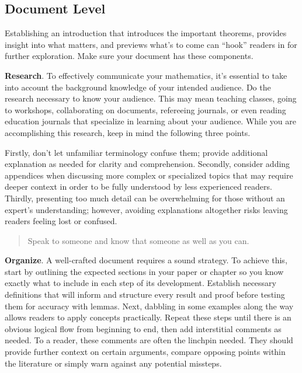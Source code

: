 \documentclass[
  twoside,
  12pt,
  letterpaper,
  fleqn]{article}
\begin{document}
\hypertarget{document-level}{%
\subsection{Document Level}\label{document-level}}

Establishing an introduction that introduces the important theorems,
provides insight into what matters, and previews what's to come can
``hook'' readers in for further exploration. Make sure your document has
these components.

\textbf{Research}. To effectively communicate your mathematics, it's
essential to take into account the background knowledge of your intended
audience. Do the research necessary to know your audience. This may mean
teaching classes, going to workshops, collaborating on documents,
refereeing journals, or even reading education journals that specialize
in learning about your audience. While you are accomplishing this
research, keep in mind the following three points.

Firstly, don't let unfamiliar terminology confuse them; provide
additional explanation as needed for clarity and comprehension.
Secondly, consider adding appendices when discussing more complex or
specialized topics that may require deeper context in order to be fully
understood by less experienced readers. Thirdly, presenting too much
detail can be overwhelming for those without an expert's understanding;
however, avoiding explanations altogether risks leaving readers feeling
lost or confused.

\begin{quote}
Speak to someone and know that someone as well as you can.
\end{quote}

\textbf{Organize}. A well-crafted document requires a sound strategy. To
achieve this, start by outlining the expected sections in your paper or
chapter so you know exactly what to include in each step of its
development. Establish necessary definitions that will inform and
structure every result and proof before testing them for accuracy with
lemmas. Next, dabbling in some examples along the way allows readers to
apply concepts practically. Repeat these steps until there is an obvious
logical flow from beginning to end, then add interstitial comments as
needed. To a reader, these comments are often the linchpin needed. They
should provide further context on certain arguments, compare opposing
points within the literature or simply warn against any potential
missteps.
\end{document}
